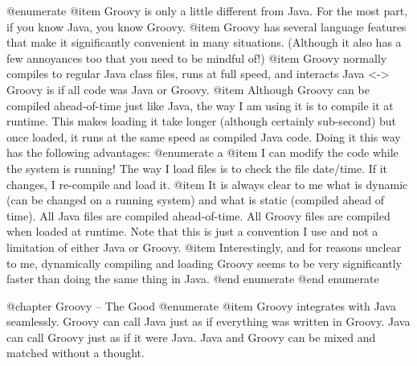 @enumerate
@item
Groovy is only a little different from Java.  For the most part, if
you know Java, you know Groovy.
@item
Groovy has several language features that make it significantly
convenient in many situations.  (Although it also has a few
annoyances too that you need to be mindful of!)
@item
Groovy normally compiles to regular Java class files, runs at full
speed, and interacts Java <-> Groovy is if all code was Java or
Groovy.
@item
Although Groovy can be compiled ahead-of-time just like Java, the
way I am using it is to compile it at runtime.  This makes loading
it take longer (although certainly sub-second) but once loaded, it
runs at the same speed as compiled Java code.  Doing it this way
has the following advantages:
@enumerate a
@item
I can modify the code while the system is running!  The way I
load files is to check the file date/time.  If it changes, I
re-compile and load it.
@item
It is always clear to me what is dynamic (can be changed on a
running system) and what is static (compiled ahead of time).
All Java files are compiled ahead-of-time.  All Groovy files
are compiled when loaded at runtime.  Note that this is just a
convention I use and not a limitation of either Java or Groovy.
@item
Interestingly, and for reasons unclear to me, dynamically
compiling and loading Groovy seems to be very significantly
faster than doing the same thing in Java.
@end enumerate
@end enumerate

@chapter Groovy -- The Good
@enumerate
@item
Groovy integrates with Java seamlessly.  Groovy can call Java just
as if everything was written in Groovy.  Java can call Groovy just
as if it were Java.  Java and Groovy can be mixed and matched
without a thought.
   
